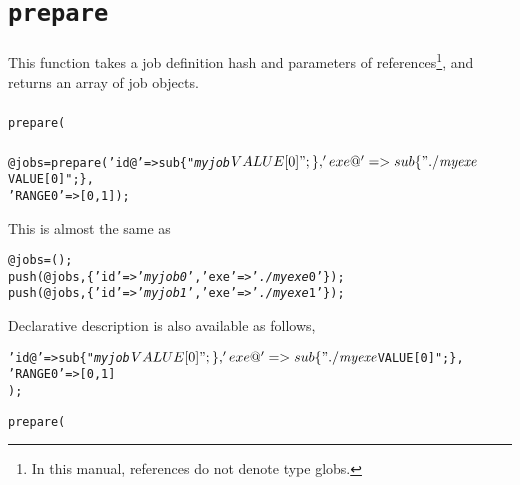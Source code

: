 \documentclass[a4paper,10pt]{report}
\begin{document}
\section{\texttt{prepare}}\label{sec:prepare}

This function takes a job definition hash and parameters of
references\footnote{In this manual, references do not denote type
globs.}, and returns an array of job objects.


\subsubsection{\format}

\begin{boxnote}
\begin{alltt}
prepare(%template);
\end{alltt}
\end{boxnote}
\vspace{\baselineskip}

\subsubsection{\example}

\begin{boxnote}
\begin{alltt}
@jobs = prepare('id@' => sub \{ "\textit{myjob}$VALUE[0]"; \},
                'exe@' => sub \{ "./\textit{myexe} $VALUE[0]"; \},
                'RANGE0' => [0,1]);
\end{alltt}
\end{boxnote}
\vspace{\baselineskip}

This is almost the same as
\begin{boxnote}
\begin{alltt}
@jobs = ();
push(@jobs, \{'id' => '\textit{myjob0}', 'exe' => '\textit{./myexe} 0'\});
push(@jobs, \{'id' => '\textit{myjob1}', 'exe' => '\textit{./myexe} 1'\});
\end{alltt}
\end{boxnote}
\vspace{\baselineskip}

Declarative description is also available as follows,
\begin{boxnote}
\begin{alltt}
%mytemplate = (
    'id@' => sub \{ "\textit{myjob}$VALUE[0]"; \},
    'exe@' => sub \{ "./\textit{myexe} $VALUE[0]"; \},
    'RANGE0' => [0,1]
);

prepare(%mytemplate);
\end{alltt}
\end{boxnote}
\vspace{\baselineskip}
\end{document}
